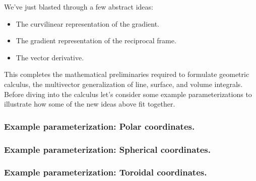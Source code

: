 %
%

We've just blasted through a few abstract ideas:
\begin{itemize}
\item The curvilinear representation of the gradient.
\item The gradient representation of the reciprocal frame.
\item The vector derivative.
\end{itemize}

This completes the 
mathematical preliminaries required to formulate geometric calculus, the multivector generalization of line, surface, and volume integrals.
Before diving into the calculus let's consider some 
example parameterizations to illustrate how some of the new ideas above fit together.

\subsubsection{Example parameterization: Polar coordinates.}
   

\subsubsection{Example parameterization: Spherical coordinates.}
   

\subsubsection{Example parameterization: Toroidal coordinates.}
   

